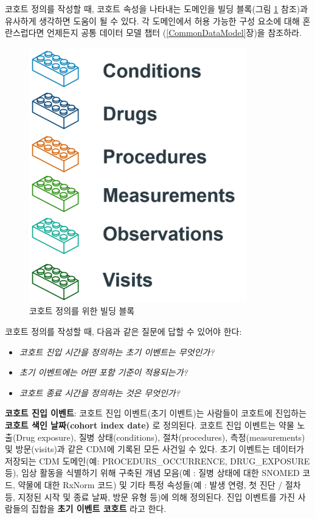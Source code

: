 \documentclass[11pt]{book}
\providecommand{\tightlist}{%
  \setlength{\itemsep}{0pt}\setlength{\parskip}{0pt}}
\theoremstyle{definition}
\theoremstyle{definition}
\theoremstyle{definition}
\theoremstyle{remark}
\begin{document}
코호트 정의를 작성할 때, 코호트 속성을 나타내는 도메인을 빌딩 블록(그림
\ref{fig:cohortLegos} 참조)과 유사하게 생각하면 도움이 될 수 있다. 각
도메인에서 허용 가능한 구성 요소에 대해 혼란스럽다면 언제든지 공통
데이터 모델 챕터 (\ref{CommonDataModel}장)을 참조하라.

\begin{figure}

{\centering \includegraphics[width=0.5\linewidth]{images/Cohorts/cohort-legos} 

}

\caption{코호트 정의를 위한 빌딩 블록}\label{fig:cohortLegos}
\end{figure}

코호트 정의를 작성할 때, 다음과 같은 질문에 답할 수 있어야 한다:

\begin{itemize}
\tightlist
\item
  \emph{코호트 진입 시간을 정의하는 초기 이벤트는 무엇인가?}
\item
  \emph{초기 이벤트에는 어떤 포함 기준이 적용되는가?}
\item
  \emph{코호트 종료 시간을 정의하는 것은 무엇인가?}
\end{itemize}

\textbf{코호트 진입 이벤트}: 코호트 진입 이벤트(초기 이벤트)는 사람들이
코호트에 진입하는 \textbf{코호트 색인 날짜(cohort index date)} 로
정의된다. 코호트 진입 이벤트는 약물 노출(Drug exposure), 질병
상태(conditions), 절차(procedures), 측정(measurements) 및 방문(visits)과
같은 CDM에 기록된 모든 사건일 수 있다. 초기 이벤트는 데이터가 저장되는
CDM 도메인(예: PROCEDURS\_OCCURRENCE, DRUG\_EXPOSURE 등), 임상 활동을
식별하기 위해 구축된 개념 모음(예 : 질병 상태에 대한 SNOMED 코드, 약물에
대한 RxNorm 코드) 및 기타 특정 속성들(예 : 발생 연령, 첫 진단 / 절차 등,
지정된 시작 및 종료 날짜, 방문 유형 등)에 의해 정의된다. 진입 이벤트를
가진 사람들의 집합을 \textbf{초기 이벤트 코호트} 라고 한다.
\end{document}
